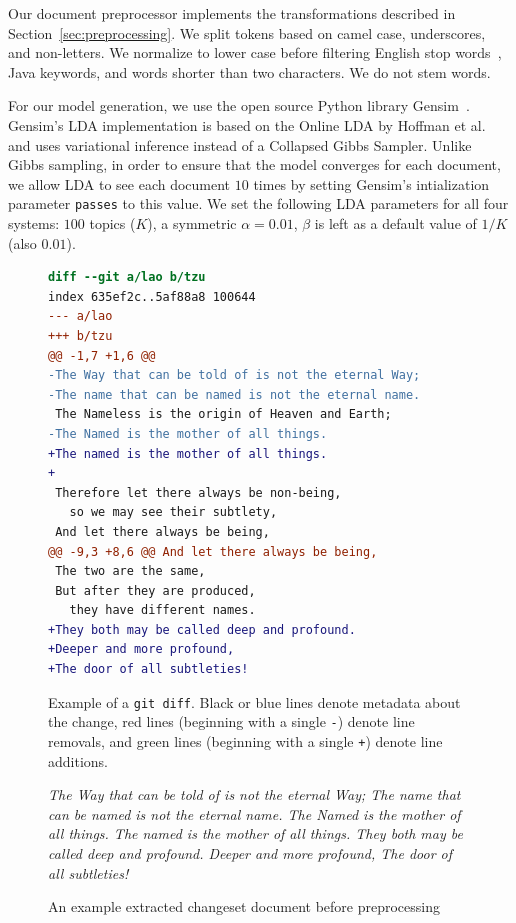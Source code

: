 Our document preprocessor implements the transformations described in Section~\ref{sec:preprocessing}.
We split tokens based on camel case, underscores, and non-letters.
We normalize to lower case before filtering English stop words~\cite{StopWords}, Java keywords, and words shorter than two characters.
We do not stem words.


For our model generation, we use the open source Python library Gensim~\cite{Gensim}.
Gensim's LDA implementation is based on the Online LDA by Hoffman et al.~\cite{Hoffman-etal:2010}
and uses variational inference instead of a Collapsed Gibbs Sampler.
Unlike Gibbs sampling, in order to ensure that the model converges for each document,
we allow LDA to see each document $10$ times by setting Gensim's intialization parameter \texttt{passes} to this value.
We set the following LDA parameters for all four systems:
$100$ topics ($K$),
a symmetric $\alpha=0.01$,
$\beta$ is left as a default value of $1/K$ (also $0.01$).


\begin{figure}[ht]
\centering
\footnotesize
\begin{lstlisting}[language=diff, basicstyle=\ttfamily]
diff --git a/lao b/tzu
index 635ef2c..5af88a8 100644
--- a/lao
+++ b/tzu
@@ -1,7 +1,6 @@
-The Way that can be told of is not the eternal Way;
-The name that can be named is not the eternal name.
 The Nameless is the origin of Heaven and Earth;
-The Named is the mother of all things.
+The named is the mother of all things.
+
 Therefore let there always be non-being,
   so we may see their subtlety,
 And let there always be being,
@@ -9,3 +8,6 @@ And let there always be being,
 The two are the same,
 But after they are produced,
   they have different names.
+They both may be called deep and profound.
+Deeper and more profound,
+The door of all subtleties!
\end{lstlisting}
\caption{Example of a \texttt{git diff}. Black or blue lines denote metadata about the change, red lines (beginning with a single \texttt{-}) denote line removals, and green lines (beginning with a single \texttt{+}) denote line additions.}
\label{fig:diff}
\end{figure}

\begin{figure}[ht]
\em
\footnotesize
The Way that can be told of is not the eternal Way;
The name that can be named is not the eternal name.
The Named is the mother of all things.
The named is the mother of all things.
They both may be called deep and profound.
Deeper and more profound,
The door of all subtleties!
\caption{An example extracted changeset document before preprocessing}
\label{fig:diffdocument}
\end{figure}



